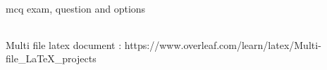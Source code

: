 \begin{enumerate}
     \begin{minipage}{\linewidth}
     \item mcq exam, question and options

          \begin{myTableStyle} \begin{tabular}{ |m{14cm}| } \hline
                \\ \hline
          \end{tabular} \end{myTableStyle} \vspace{0.08in}
     \end{minipage}

     \item Multi file latex document : https://www.overleaf.com/learn/latex/Multi-file\_LaTeX\_projects

\end{enumerate}
